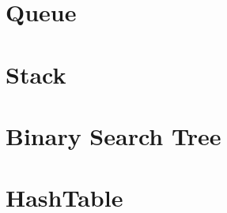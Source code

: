 \documentclass[../main.tex]{subfiles}
\begin{document}
	
	\section{Queue}
	
	
	
	
	\section{Stack}
	
	
	
	
	\section{Binary Search Tree}
	
	\section{HashTable}
	
\end{document}
